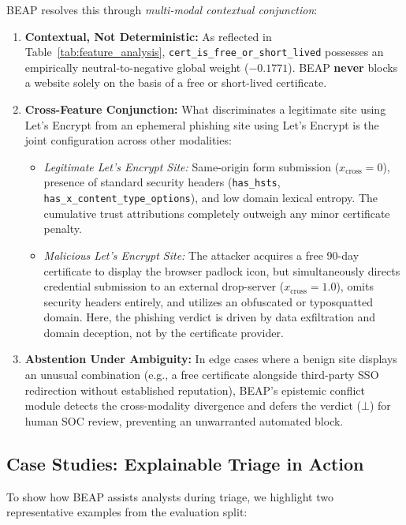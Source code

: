 \documentclass[conference]{IEEEtran}
\begin{document}
BEAP resolves this through \textit{multi-modal contextual conjunction}:
\begin{enumerate}[leftmargin=2.5em]
    \item \textbf{Contextual, Not Deterministic:} As reflected in Table~\ref{tab:feature_analysis}, \texttt{cert\_is\_free\_or\_short\_lived} possesses an empirically neutral-to-negative global weight ($-0.1771$). BEAP \textbf{never} blocks a website solely on the basis of a free or short-lived certificate.
    \item \textbf{Cross-Feature Conjunction:} What discriminates a legitimate site using Let's Encrypt from an ephemeral phishing site using Let's Encrypt is the joint configuration across other modalities:
    \begin{itemize}[leftmargin=1.2em,label=--]
        \item \textit{Legitimate Let's Encrypt Site:} Same-origin form submission ($x_{\text{cross}} = 0$), presence of standard security headers (\texttt{has\_hsts}, \texttt{has\_x\_content\_type\_options}), and low domain lexical entropy. The cumulative trust attributions completely outweigh any minor certificate penalty.
        \item \textit{Malicious Let's Encrypt Site:} The attacker acquires a free 90-day certificate to display the browser padlock icon, but simultaneously directs credential submission to an external drop-server ($x_{\text{cross}} = 1.0$), omits security headers entirely, and utilizes an obfuscated or typosquatted domain. Here, the phishing verdict is driven by data exfiltration and domain deception, not by the certificate provider.
    \end{itemize}
    \item \textbf{Abstention Under Ambiguity:} In edge cases where a benign site displays an unusual combination (e.g., a free certificate alongside third-party SSO redirection without established reputation), BEAP's epistemic conflict module detects the cross-modality divergence and defers the verdict ($\bot$) for human SOC review, preventing an unwarranted automated block.
\end{enumerate}

\subsection{Case Studies: Explainable Triage in Action}\label{case-studies}

To show how BEAP assists analysts during triage, we highlight two representative examples from the evaluation split:
\end{document}
